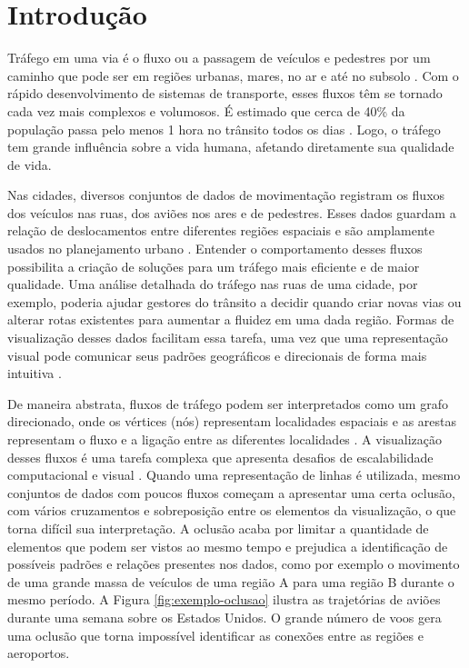 \chapter{Introdução}
\label{cap:introducao}

  Tráfego em uma via é o fluxo ou a passagem de veículos e pedestres por
um caminho que pode ser em regiões urbanas, mares,
no ar e até no subsolo \citep{Chen2015}. Com o rápido desenvolvimento de
sistemas de transporte, esses fluxos têm se tornado cada vez mais complexos e
volumosos.  É estimado que cerca de 40\% da população passa pelo menos 1 hora
no trânsito todos os dias \citep{Zhang2011}. Logo, o tráfego tem grande
influência sobre a vida humana, afetando diretamente sua qualidade de vida.

Nas cidades, diversos conjuntos de dados de movimentação registram os fluxos
dos veículos nas ruas, dos aviões nos ares e de pedestres. Esses dados guardam
a relação de deslocamentos entre diferentes regiões espaciais e são amplamente
usados no planejamento urbano \citep{Anita2017}.  Entender o comportamento
desses fluxos possibilita a criação de soluções para um tráfego mais eficiente
e de maior qualidade. Uma análise detalhada do tráfego nas ruas de uma cidade,
por exemplo, poderia ajudar gestores do trânsito a decidir quando criar novas vias
ou alterar rotas existentes para aumentar a fluidez em uma dada região. Formas
de visualização desses dados facilitam essa tarefa, uma vez que uma representação
visual pode comunicar seus padrões geográficos e direcionais de forma mais intuitiva
\citep{Liu2013}.

  De maneira abstrata, fluxos de tráfego podem ser interpretados como um grafo
direcionado, onde os vértices (nós) representam localidades espaciais e as
arestas representam o fluxo e a ligação entre as diferentes localidades
\citep{Anita2017}. A visualização desses fluxos é uma tarefa complexa que
apresenta desafios de escalabilidade computacional e visual \citep{Klein2014}.
Quando uma representação de linhas é utilizada, mesmo conjuntos de dados com
poucos fluxos começam a apresentar uma certa oclusão, com vários cruzamentos e
sobreposição entre os elementos da visualização, o que torna difícil sua
interpretação. A oclusão acaba por limitar a quantidade de elementos que podem
ser vistos ao mesmo tempo e prejudica a identificação de possíveis padrões e
relações presentes nos dados, como por exemplo o movimento de uma grande massa
de veículos de uma região A para uma região B durante o mesmo período. A Figura
\ref{fig:exemplo-oclusao} ilustra as trajetórias de aviões durante uma semana
sobre os Estados Unidos. O grande número de voos gera uma oclusão que torna
impossível identificar as conexões entre as regiões e aeroportos.

